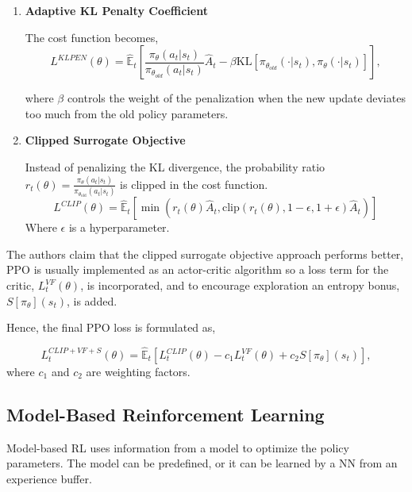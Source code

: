 \begin{enumerate}
    \item \textbf{Adaptive KL Penalty Coefficient}
    
    The cost function becomes,
    \begin{equation}
        L^{KLPEN}(\theta) = \hat{\mathbb{E}}_{t} \left[ \frac{\pi_{\theta}(a_t | s_t)}{\pi_{\theta_{old}}(a_t | s_t)} \hat{A}_t - \beta \text{KL}[\pi_{\theta_{old}}(\cdot | s_t), \pi_{\theta}(\cdot | s_t)] \right],
    \end{equation}

    where $\beta$ controls the weight of the penalization when the new update deviates too much from the old policy parameters. \\
    \item \textbf{Clipped Surrogate Objective}
    
    Instead of penalizing the KL divergence, the probability ratio $r_t(\theta) = \frac{\pi_{\theta}(a_t | s_t)}{\pi_{\theta_{\text{old}}}(a_t | s_t)}$ is clipped in the cost function.
    \begin{equation}
        L^{CLIP}(\theta) = \hat{\mathbb{E}}_{t} \left[ \min\left(r_t(\theta) \hat{A}_t, \text{clip}(r_t(\theta), 1 - \epsilon, 1 + \epsilon) \hat{A}_t\right) \right]
    \end{equation}
    Where $\epsilon$ is a hyperparameter.
\end{enumerate}
The authors claim that the clipped surrogate objective approach performs better, \ac{PPO} is usually implemented as an actor-critic algorithm so a loss term for the critic, $L_t^{VF}(\theta)$, is incorporated, and to encourage exploration an entropy bonus, $S[\pi_\theta](s_t)$, is added.

\noindent Hence, the final PPO loss is formulated as,

\begin{equation}
L_t^{CLIP+VF+S}(\theta) = \hat{\mathbb{E}}_t \left[ L_t^{CLIP}(\theta) - c_1 L_t^{VF}(\theta) + c_2 S[\pi_\theta](s_t) \right],   
\end{equation}
where $c_1$ and $c_2$ are weighting factors.

\subsection{Model-Based Reinforcement Learning}
Model-based \ac{RL} uses information from a model to optimize the policy parameters.
The model can be predefined, or it can be learned by a \ac{NN} from an experience buffer.

